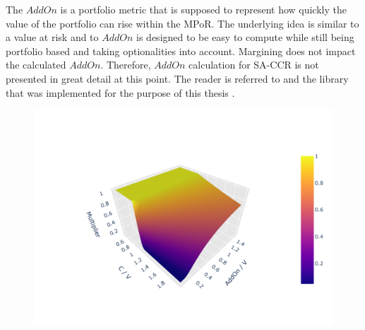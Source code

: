 \documentclass[../Thesis_AHoecherl.tex]{subfiles}
\begin{document}
The $AddOn$ is a portfolio metric that is supposed to represent how quickly the value of the portfolio can rise within the \gls{MPoR}. The underlying idea is similar to a value at risk and to $AddOn$ is designed to be easy to compute while still being portfolio based and taking optionalities into account. Margining does not impact the calculated $AddOn$. Therefore, $AddOn$ calculation for SA-CCR is not presented in great detail at this point. The reader is referred to  and the library that was implemented for the purpose of this thesis \cite{Hoecherl2020}.


% 

\begin{figure}
	\centering
	\includegraphics[scale=0.9]{Graphics/SACCR_Multiplier_Function.pdf}
	\caption{}
	\label{fig:multiplier}
\end{figure}

% 

% 



% 

% 

% 
\end{document}
